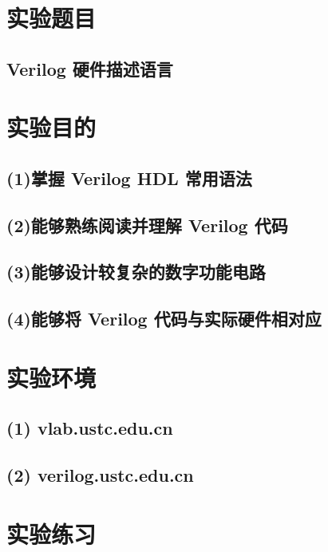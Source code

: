\documentclass{article}
\begin{document}
    \section{实验题目}
        \subsection*{\qquad Verilog 硬件描述语言}

    \section{实验目的}
        \subsection*{\qquad (1)掌握 Verilog HDL 常用语法}
        \subsection*{\qquad (2)能够熟练阅读并理解 Verilog 代码}
        \subsection*{\qquad (3)能够设计较复杂的数字功能电路}
        \subsection*{\qquad (4)能够将 Verilog 代码与实际硬件相对应}
        
    \section{实验环境}
        \subsection*{\qquad (1) vlab.ustc.edu.cn}
        \subsection*{\qquad (2) verilog.ustc.edu.cn}
    
    \section{实验练习}
\end{document}
